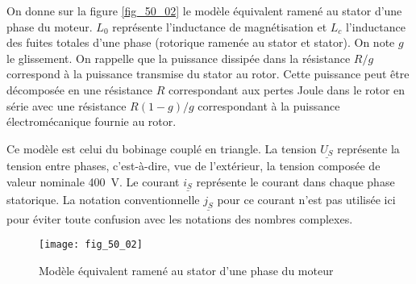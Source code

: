 \ifprof
\else
\fi

\ifprof
\else
\fi

On donne sur la figure \autoref{fig_50_02} le modèle équivalent ramené au stator d’une phase du moteur.
$L_0$ représente l’inductance de magnétisation et $L_c$ l’inductance des fuites totales d’une
phase (rotorique ramenée au stator et stator). On note $g$ le glissement. On rappelle que la
puissance dissipée dans la résistance $R/g$ correspond à la puissance transmise du stator
au rotor. Cette puissance peut être décomposée en une résistance $R$ correspondant aux
pertes Joule dans le rotor en série avec une résistance $R(1 - g)/g$ correspondant à la
puissance électromécanique fournie au rotor.

\begin{rem}
Ce modèle est celui du bobinage couplé en triangle. La tension $\underline{U_S}$ représente
la tension entre phases, c’est-à-dire, vue de l’extérieur, la tension composée de valeur
nominale \SI{400}{V}. Le courant $\underline{i_S}$ représente le courant dans chaque phase statorique. La
notation conventionnelle $\underline{j_S}$ pour ce courant n’est pas utilisée ici pour éviter toute confusion
avec les notations des nombres complexes.
\end{rem}

\begin{figure}[H]
\centering
\texttt{[image: fig\_50\_02]}
\caption{Modèle équivalent ramené au stator d’une phase du moteur \label{fig_50_02}}
\end{figure}

\ifprof
\else
\fi


\ifprof
\else
\fi

\ifprof
\else
\fi

